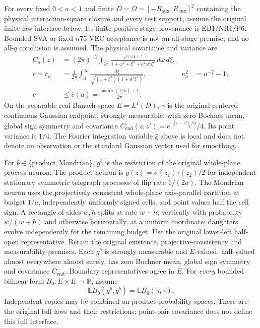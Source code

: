 \documentclass[11pt]{article}
\theoremstyle{plain}
\theoremstyle{definition}
\theoremstyle{remark}
\newcommand{\R}{\mathbb{R}}
\newcommand{\E}{\mathbb{E}}
\begin{document}
For every fixed $0<a<1$ and finite $D=\Omega=[-R_{\mathrm{aux}},R_{\mathrm{aux}}]^2$
containing the physical interaction-square closure and every test support,
assume the original finite-law interface below. Its finite-positive-stage
provenance is EB1/NR1/P6. Bounded SVA or fixed-$n75$ VEC acceptance is not
an all-stage premise, and no all-$q$ conclusion is assumed. The physical
covariance and variance are
\begin{align*}
 C_a(z)&=(2\pi)^{-2}\int_{\R^2}
 \frac{e^{i(\omega,\xi)\cdot z}}{1+\omega^2+\xi^2+a^2\omega^2\xi^2}
 \,d\omega\,d\xi,\\
 c=c_a&=\frac1{2\pi}\int_0^\infty
 \frac{d\xi}{\sqrt{(1+\xi^2)(1+a^2\xi^2)}},
 &\kappa_a^2&=a^{-2}-1,\\
 c&\le\overline c(a)=\frac{\operatorname{asinh}(1/a)+1}{2\pi}.
\end{align*}
On the separable real Banach space $E=L^4(D)$, $\gamma$ is the original
centered continuous Gaussian endpoint, strongly measurable, with zero
Bochner mean, global sign symmetry and covariance
$C_{\mathrm{end}}(z,z')=e^{-|z-z'|_1/a}/4$. Its point variance is $1/4$.
The Fourier integration variable $\xi$ above is local and does not denote
an observation or the standard Gaussian vector used for smoothing.

For $b\in\{\mathrm{product},\mathrm{Mondrian}\}$, $g^b$ is the restriction
of the original whole-plane process neuron. The product neuron is
$g(z)=\sigma(z_1)\tau(z_2)/2$ for independent stationary symmetric
telegraph processes of flip rate $1/(2a)$. The Mondrian neuron uses the
projectively consistent whole-plane axis-parallel partition at budget
$1/a$, independently uniformly signed cells, and point values half the
cell sign. A rectangle of sides $w,h$ splits at rate $w+h$, vertically
with probability $w/(w+h)$ and otherwise horizontally, at a uniform
coordinate; daughters evolve independently for the remaining budget.
Use the original lower-left half-open representative. Retain the original
existence, projective-consistency and measurability premises. Each $g^b$
is strongly measurable and $E$-valued, half-valued almost everywhere almost
surely, has zero Bochner mean, global sign symmetry and covariance
$C_{\mathrm{end}}$. Boundary representatives agree in $E$. For \emph{every}
bounded bilinear form $B_0:E\times E\to\R$, assume
\[
 \E B_0(g^b,g^b)=\E B_0(\gamma,\gamma).
\]
Independent copies may be combined on product probability spaces. These
are the original full laws and their restrictions; point-pair covariance
does not define this full interface.
\end{document}
